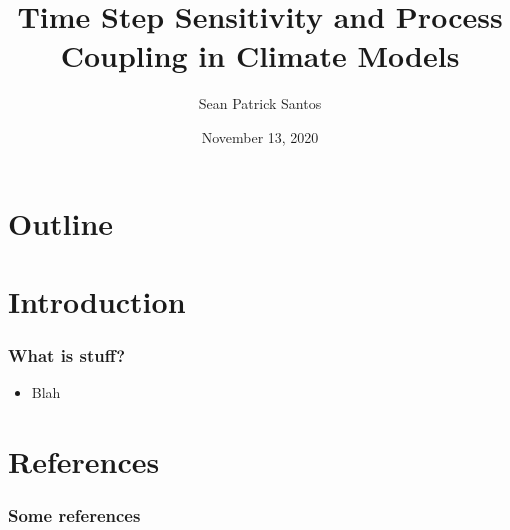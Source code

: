 \documentclass{beamer}[2012/10/15]
\title{Time Step Sensitivity and Process Coupling in Climate Models}
\author{Sean Patrick Santos}
\institute{University of Washington}
\date{November 13, 2020}
\begin{document}
\frame{\titlepage}

\section*{Outline}
\frame{\tableofcontents}

\section{Introduction}

\begin{frame}
  \frametitle{What is stuff?}
  \begin{itemize}[<+->]
  \item Blah
  \end{itemize}
\end{frame}

\section{References}

\begin{frame}
  \frametitle{Some references}
  \nocite{Santos2020b}
  \printbibliography
\end{frame}
\end{document}
